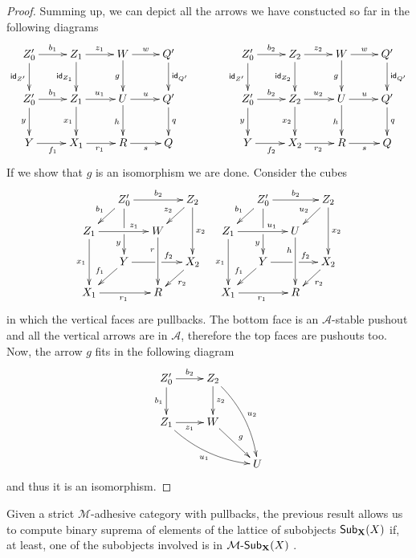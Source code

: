 \begin{proof}
	Summing up, we can depict all the arrows we have constucted so far in the following diagrams
	\[\xymatrix{Z'_0 \ar[r]^{b_1} \ar[d]_{\id{Z'}}& Z_1 \ar[r]^{z_1} \ar[d]_{\id{Z_1}} &  W \ar[d]_g \ar[r]^{w} & Q' \ar[d]^{\id{Q'}}&& Z'_0 \ar[r]^{b_2}  \ar[d]_{\id{Z'}}& Z_2 \ar[d]_{\id{Z_2}} \ar[r]^{z_2}&  W \ar[d]_g\ar[r]^{w}& Q' \ar[d]^{\id{Q'}}\\ Z'_0 \ar[d]_{y} \ar[r]^{b_1} & Z_1  \ar[r]^{u_1}\ar[d]_{x_1}&  U \ar[d]_h \ar[r]^{u} & Q'  \ar[d]^{q}& &Z'_0  \ar[d]_{y}\ar[r]^{b_2}  & Z_2  \ar[r]^{u_2}\ar[d]_{x_2} &  U \ar[d]_h \ar[r]^{u}& Q' \ar[d]^{q} \\ Y \ar[r]_{f_1}& X_1 \ar[r]_{r_1} & R \ar[r]_s& Q & &Y \ar[r]_{f_2} & X_2 \ar[r]_{r_2}& R \ar[r]_s & Q}\]
	If we show that $g$ is an isomorphism we are done. Consider the cubes
	\[\xymatrix@C=13pt@R=13pt{&Z_0'\ar[dd]|\hole_(.7){y}\ar[rr]^{b_2} \ar[dl]_{b_1} && Z_2 \ar[dd]^{x_2} \ar[dl]_{z_2}  &&Z'_0\ar[dd]|\hole_(.7){y}\ar[rr]^{b_2} \ar[dl]_{b_1} && Z_2 \ar[dd]^{x_2} \ar[dl]_{u_2}\\Z_1  \ar[dd]_{x_1}\ar[rr]^(.65){z_1} & & W \ar[dd]_(.3){r}&& Z_1  \ar[dd]_{x_1}\ar[rr]^(.65){u_1} & &U \ar[dd]_(.3){h}\\&Y\ar[rr]|\hole^(.65){f_2} \ar[dl]_{f_1} && X_2 \ar[dl]^{r_2} && Y\ar[rr]|\hole^(.65){f_2} \ar[dl]_{f_1} && X_2 \ar[dl]^{r_2}\\X_1 \ar[rr]_{r_1} & & R && X_1 \ar[rr]_{r_1} & & R}\]
	in which the vertical faces are pullbacks. The bottom face is an $\mathcal{A}$-stable pushout and all the vertical arrows are in $\mathcal{A}$, therefore the top faces are pushouts too. Now,  the arrow $g$ fits in the following  diagram
	\[\xymatrix{Z'_0\ar[r]^{b_2} \ar[d] _{b_1}& Z_2 \ar@/^.3cm/[ddr]^{u_2}\ar[d]^{z_2} \\ Z_1 \ar[r]_{z_1}  \ar@/_.3cm/[drr]_{u_1}& W \ar[dr]^{g} \\ &&U}\]
	and thus it is an isomorphism.
\end{proof} 


Given a strict $\mathcal{M}$-adhesive category with pullbacks, the previous result allows us to compute binary suprema of elements of the lattice of subobjects $\mathsf{Sub}_{\textbf {\textup{X}}}(X)$ if, at least, one of the subobjects involved is in ${\mathcal{M}}\textrm{-}\mathsf{Sub}_{\textbf {\textup{X}}}(X)$ .

